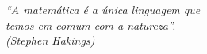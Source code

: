 \begin{epigrafe}
	\vspace*{\fill}
	\hspace{8cm}
	\begin{minipage}{.5\textwidth}
	\SingleSpacing
	\textit{``A matem\'atica \'e a única linguagem que\\
	temos em comum com a natureza''.\\
	(Stephen Hakings)}
	\end{minipage}%
\end{epigrafe}
